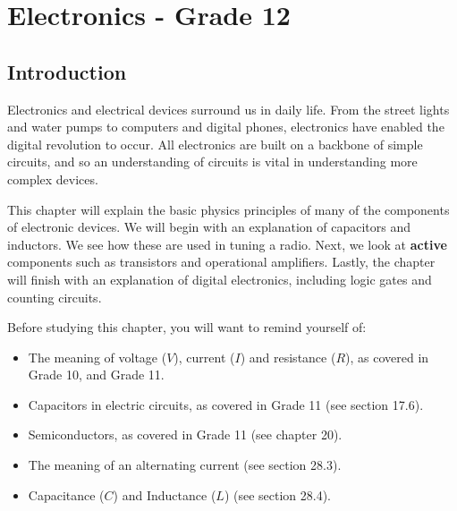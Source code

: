 
\setlength{\parskip}{2ex}

\chapter{Electronics - Grade 12}
\label{p:em:el12}


\section{Introduction}
Electronics and electrical devices surround us in daily life. From the street lights and water pumps to computers and digital phones, electronics have enabled the digital revolution to occur. All electronics are built on a backbone of simple circuits, and so an understanding of circuits is vital in understanding more complex devices.

This chapter will explain the basic physics principles of many of the components of electronic devices.  We will begin with an explanation of capacitors and inductors. We see how these are used in tuning a radio.  Next, we look at {\bf active} components such as transistors and operational amplifiers. Lastly, the chapter will finish with an explanation of digital electronics, including logic gates and counting circuits. 

Before studying this chapter, you will want to remind yourself of:
\begin{itemize}
\item The meaning of voltage ($V$), current ($I$) and resistance ($R$), as covered in Grade 10, and Grade 11.
\item Capacitors in electric circuits, as covered in Grade 11 (see section 17.6).
\item Semiconductors, as covered in Grade 11 (see chapter 20).
\item The meaning of an alternating current (see section 28.3).
\item Capacitance ($C$) and Inductance ($L$) (see section 28.4).
\end{itemize}

